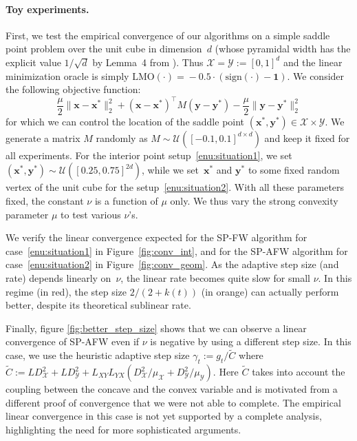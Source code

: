 \documentclass[twoside]{article}
\newcommand{\X}{\mathcal{X}}
\newcommand{\Y}{\mathcal{Y}}
\newcommand{\M}{\X \times \Y}
\newcommand{\x}{\bm{x}}
\newcommand{\y}{\bm{y}}
\newcommand{\gap}{g_{t}}
\newcommand{\CondNumb}{\nu}
\newcommand{\0}{\mathbf{0}} %
\begin{document}
  \paragraph{Toy experiments.} %
  \label{par:experiments_on_toy_examples}
First, we test the empirical convergence of our algorithms on a simple saddle point problem over the unit cube in dimension~$d$ (whose pyramidal width has the explicit value $1/\sqrt{d}$ by Lemma~4 from \citet{lacoste2015global}). 
Thus $\X = \Y := [0,1]^d$ and the linear minimization oracle is simply $\text{LMO}(\cdot)\! = \!-0.5 \cdot(\text{sign}(\cdot)-\bm{1})$. 
We consider the following objective function:
  \begin{equation}
    \frac{\mu}{2}\|\x- \x^*\|_2^2 + (\x-\x^*)^\top M(\y-\y^*) - \frac{\mu}{2} \|\y-\y^*\|_2^2
  \end{equation}
for which we can control the location of the saddle point $(\x^*,\y^*) \in \M$. We generate a matrix $M$ randomly as $M \sim \mathcal U([-0.1,0.1]^{d\times d})$ and keep it fixed for all experiments. For the interior point setup~\eqref{enu:situation1}, we set~$(\x^*,\y^*) \sim \mathcal U ([0.25,0.75]^{2d})$, while we set~$\x^*$ and $\y^*$ to some fixed random vertex of the unit cube for the setup~\eqref{enu:situation2}. With all these parameters fixed, the constant $\CondNumb$ is a function of $\mu$ only. We thus vary the strong convexity parameter $\mu$ to test various $\CondNumb$'s.

We verify the linear convergence expected for the SP-FW algorithm for case~\eqref{enu:situation1} in Figure~\ref{fig:conv_int}, and for the 
SP-AFW algorithm for case~\eqref{enu:situation2} in Figure~\ref{fig:conv_geom}. 
As the adaptive step size (and rate) depends linearly on~$\CondNumb$, the linear rate becomes quite slow for small $\CondNumb$. In this regime (in red), the step size $2/(2+k(t))$ (in orange) can actually perform better, despite its theoretical sublinear rate.
%

Finally, figure \ref{fig:better_step_size} shows that we can observe a linear convergence of SP-AFW even if $\CondNumb$ is negative by using a different step size. In this case, we use the heuristic adaptive step size $\gamma_t := \gap / \tilde{C}$ where 
$\tilde{C} := L D_\X^2+LD_\Y^2+ L_{XY} L_{YX}\left( D_\X^2/\mu_\X + D_\Y^2/\mu_\Y \right) $. Here $\tilde{C}$ takes into account the coupling between the concave and the convex variable and is motivated from a different proof of convergence that we were not able to complete. The empirical linear convergence in this case is not yet supported by a complete analysis, highlighting the need for more sophisticated arguments.
\end{document}
